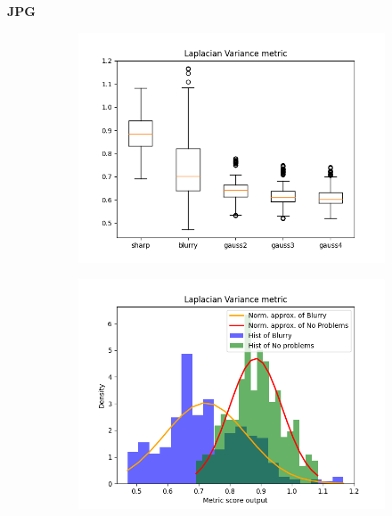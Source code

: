 \textbf{JPG}
\begin{figure}[H]
    \centering
    \begin{subfigure}[t]{0.48\textwidth}
        \includegraphics[width=\textwidth]{Figures/lv/output_boxplot_lv_jpg.png}
        \caption{}
        \label{fig:LV_roc}
    \end{subfigure}\hspace{1em}
    \begin{subfigure}[t]{0.48\textwidth}
	    \includegraphics[width=\textwidth]{Figures/lv/output_dens_lv_jpg.png}
	    \caption{}
	    \label{fig:LV_dens_jpg}
    \end{subfigure}\hspace{1em}


\end{figure}
